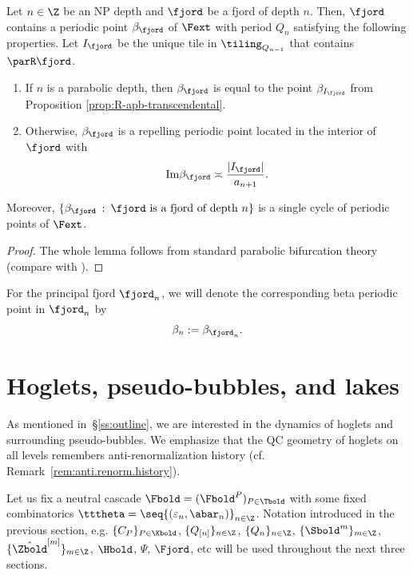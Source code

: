 \documentclass{amsart}
\begin{document}
\begin{lemma}
\label{lem:repelling-periodic-point}
    Let $n \in \Z$ be an NP depth and $\fjord$ be a fjord of depth $n$. 
    Then, $\fjord$ contains a periodic point $\beta_\fjord$ of $\Fext$ with period $Q_n$ satisfying the following properties.
    Let $I_{\fjord}$ be the unique tile in $\tiling_{Q_{n-1}}$ that contains $\parR \fjord$.
    \begin{enumerate}
        \item If $n$ is a parabolic depth, then $\beta_\fjord$ is equal to the point $\beta_{I_{\fjord}}$ from Proposition \ref{prop:R-apb-transcendental}.
        \item Otherwise, $\beta_\fjord$ is a repelling periodic point located in the interior of $\fjord$ with 
            \[
                \textnormal{Im} \beta_\fjord \asymp \frac{|I_{\fjord}|}{a_{n+1}}.
            \]
    \end{enumerate}
    Moreover, $\{\beta_{\fjord} \: : \: \fjord \text{ is a fjord of depth }n\}$ is a single cycle of periodic points of $\Fext$.
\end{lemma}

\begin{proof}
    The whole lemma follows from standard parabolic bifurcation theory (compare with \cite[Lemma 2.4]{dFdM00}).
\end{proof}

For the principal fjord $\fjord_n$, we will denote the corresponding beta periodic point in $\fjord_n$ by 
\[
\beta_n := \beta_{\fjord_n}.
\]



\section{Hoglets, pseudo-bubbles, and lakes}
\label{sec:bounds}

As mentioned in~\S\ref{ss:outline}, we are interested in the dynamics of hoglets and surrounding pseudo-bubbles. 
We emphasize that the QC geometry of hoglets on all levels remembers anti-renormalization history (cf. Remark~\ref{rem:anti.renorm.history}).

Let us fix a neutral cascade $\Fbold = (\Fbold^P)_{P \in \Tbold}$ with some fixed combinatorics $\tttheta = \seq{ (\varepsilon_n, \abar_n) }_{n \in \Z}$. 
Notation introduced in the previous section, e.g. $\{C_P\}_{P \in \Kbold}$, $\{Q_{[n]}\}_{n \in \Z}$, $\{Q_n\}_{n \in \Z}$, $\{\Sbold^m\}_{m \in \Z}$, $\{\hat{\Zbold}^{[m]}\}_{m \in \Z}$, $\Hbold$, $\Psi$, $\Fjord$, etc will be used throughout the next three sections.
\end{document}
